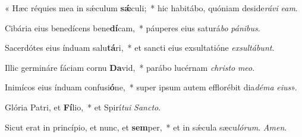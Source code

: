 \item « Hæc réquies mea in sǽculum \textbf{sǽ}culi;~* hic habitábo, quóniam deside\textit{rávi} \textit{eam}.

\item Cibária eius benedícens bene\textbf{dí}cam,~* páuperes eius saturá\textit{bo} \textit{pánibus}.

\item Sacerdótes eius índuam salu\textbf{tá}ri,~* et sancti eius exsultatióne \textit{exsultábunt}.

\item Illic germináre fáciam cornu \textbf{Da}vid,~* parábo lucérnam \textit{christo} \textit{meo}.

\item Inimícos eius índuam confusi\textbf{ó}ne,~* super ipsum autem efflorébit dia\textit{déma} \textit{eius}».

\item Glória Patri, et \textbf{Fí}lio,~* et Spirí\textit{tui} \textit{Sancto}.

\item Sicut erat in princípio, et nunc, et \textbf{sem}per,~* et in sǽcula sæcu\textit{lórum}. \textit{Amen}.